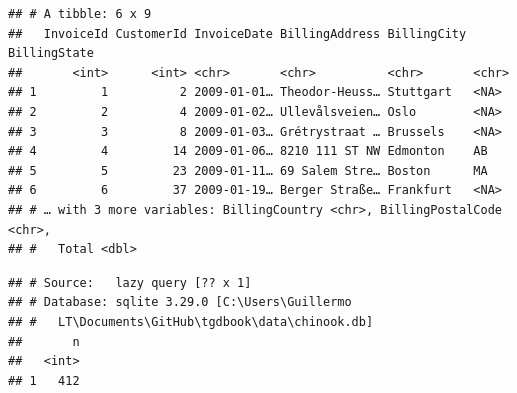 \documentclass[]{book}
\newenvironment{Shaded}{\begin{snugshade}}{\end{snugshade}}
\newcommand{\CommentTok}[1]{\textcolor[rgb]{0.56,0.35,0.01}{\textit{#1}}}
\newcommand{\NormalTok}[1]{#1}
\newcommand{\OperatorTok}[1]{\textcolor[rgb]{0.81,0.36,0.00}{\textbf{#1}}}
\newcommand{\StringTok}[1]{\textcolor[rgb]{0.31,0.60,0.02}{#1}}
\begin{document}
\begin{verbatim}
## # A tibble: 6 x 9
##   InvoiceId CustomerId InvoiceDate BillingAddress BillingCity BillingState
##       <int>      <int> <chr>       <chr>          <chr>       <chr>       
## 1         1          2 2009-01-01… Theodor-Heuss… Stuttgart   <NA>        
## 2         2          4 2009-01-02… Ullevålsveien… Oslo        <NA>        
## 3         3          8 2009-01-03… Grétrystraat … Brussels    <NA>        
## 4         4         14 2009-01-06… 8210 111 ST NW Edmonton    AB          
## 5         5         23 2009-01-11… 69 Salem Stre… Boston      MA          
## 6         6         37 2009-01-19… Berger Straße… Frankfurt   <NA>        
## # … with 3 more variables: BillingCountry <chr>, BillingPostalCode <chr>,
## #   Total <dbl>
\end{verbatim}

\begin{Shaded}
\end{Shaded}

\begin{verbatim}
## # Source:   lazy query [?? x 1]
## # Database: sqlite 3.29.0 [C:\Users\Guillermo
## #   LT\Documents\GitHub\tgdbook\data\chinook.db]
##       n
##   <int>
## 1   412
\end{verbatim}
\end{document}
